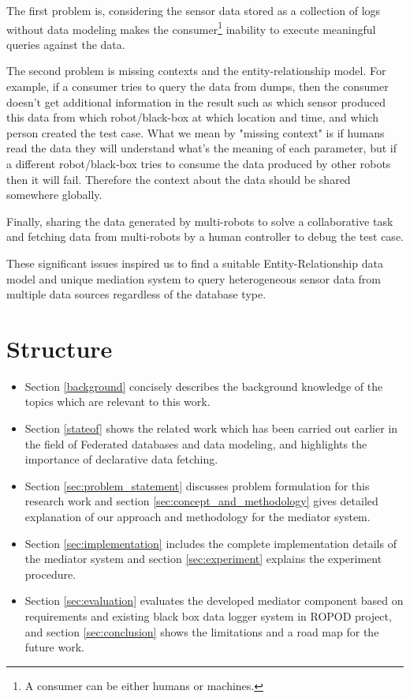 		The first problem is, considering the sensor data stored as a collection of logs without data modeling makes the consumer\footnote{A consumer can be either humans or machines.} inability to execute meaningful queries against the data. 
		
		The second problem is missing contexts and the entity-relationship model. For example, if a consumer tries to query the data from dumps, then the consumer doesn't get additional information in the result such as which sensor produced this data from which robot/black-box at which location and time, and which person created the test case. What we mean by "missing context" is if humans read the data they will understand what's the meaning of each parameter, but if a different robot/black-box tries to consume the data produced by other robots then it will fail. Therefore the context about the data should be shared somewhere globally.
		
		Finally, sharing the data generated by multi-robots to solve a collaborative task and fetching data from multi-robots by a human controller to debug the test case.
		
		These significant issues inspired us to find a suitable Entity-Relationship data model and unique mediation system to query heterogeneous sensor data from multiple data sources regardless of the database type.


    \section{Structure}
	
		\begin{itemize}
			\item Section \ref{background} concisely describes the background knowledge of the topics which are relevant to this work.
			\item Section \ref{stateof} shows the related work which has been carried out earlier in the field of Federated databases and data modeling, and highlights the importance of declarative data fetching.
			\item Section \ref{sec:problem_statement} discusses problem formulation for this research work and section \ref{sec:concept_and_methodology} gives detailed explanation of our approach and methodology for the mediator system.
			\item Section \ref{sec:implementation} includes the complete implementation details of the mediator system and section \ref{sec:experiment} explains the experiment procedure.
			\item Section \ref{sec:evaluation} evaluates the developed mediator component based on requirements and existing black box data logger system in ROPOD project, and section \ref{sec:conclusion} shows the limitations and a road map for the future work. 
		\end{itemize}

\let\cleardoublepage\clearpage

